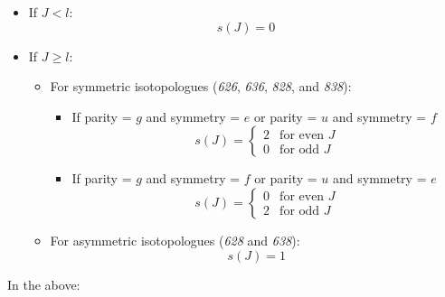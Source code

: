 \documentclass{report}
\begin{document}
\begin{itemize}
    \item If \( J < l \):
    \[s(J) = 0\]

    \item If \( J \geq l \):
    \begin{itemize}
        \item For symmetric isotopologues (\textit{626}, \textit{636}, \textit{828}, and \textit{838}):
        \begin{itemize}
            \item If parity = \(g\) and symmetry = \(e\) \quad or \quad  parity = \(u\) and symmetry = \(f\)
            \[
            s(J) = \begin{cases}
            2 & \text{for even } J \\
            0 & \text{for odd } J
            \end{cases}
            \]
            \item If parity = \(g\) and symmetry = \(f\) \quad or \quad  parity = \(u\) and symmetry = \(e\)
            \[
            s(J) = \begin{cases}
            0 & \text{for even } J \\
            2 & \text{for odd } J
            \end{cases}
            \]
        \end{itemize}

        \item For asymmetric isotopologues (\textit{628} and \textit{638}):
        \[s(J) = 1\]
    \end{itemize}
\end{itemize}

In the above:
\end{document}
